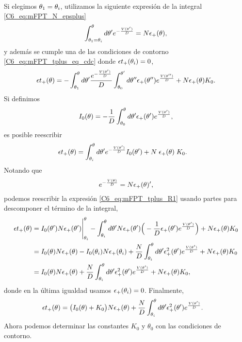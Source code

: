 \documentclass[./main.tex]{subfiles}
\begin{document}
Si elegimos $\theta_1 = \theta_i$, utilizamos la siguiente expresión de la integral \ref{C6_eq:mFPT_N_epsplus}
\begin{align*}
    \int_{\theta_1 = \theta_i}^{\theta} d\theta'  e^{- \frac{V(\theta')}{D}} = N \epsilon_{+}(\theta),
\end{align*}
y además se cumple una de las condiciones de contorno \ref{C6_eq:mFPT_tplus_eq_cdc} donde $\epsilon t_+(\theta_i) = 0$,
\begin{align}
   \epsilon t_+(\theta) = - \int_{\theta_1}^{\theta} d\theta'  \frac{ e^{- \frac{V(\theta')}{D}} }{D} \int_{\theta_0}^{\theta'} d \theta'' \epsilon_{+}(\theta'') e^{ \frac{V(\theta'')}{D}} + N \epsilon_{+}(\theta) K_0 .
\end{align}
Si definimos 
\begin{align*}
I_0(\theta) =  -\frac{1}{D} \int_{\theta_0}^\theta d \theta' \epsilon_{+}(\theta') e^{ \frac{V(\theta')}{D}}, 
\end{align*}
es posible reescribir
\begin{align}
   \epsilon t_+(\theta) &= \int_{\theta_i}^{\theta} d\theta'  e^{- \frac{V(\theta')}{D}}  I_0(\theta')+  N \; \epsilon_{+}(\theta) \; K_0 .
   \label{C6_eq:mFPT_tplus_R1}
\end{align}
Notando que
\begin{align*}
    e^{- \frac{V(\theta)}{D}} = N \epsilon_{+}(\theta)',
\end{align*}
podemos reescribir la expresión \ref{C6_eq:mFPT_tplus_R1} usando partes para descomponer el término de la integral,
\begin{align}
   \epsilon t_+(\theta) &= I_0(\theta') N \epsilon_{+}(\theta') \Bigg|_{\theta_i}^{\theta} - \int_{\theta_i}^{\theta} d\theta' N \epsilon_{+}(\theta') \Big(-\frac{1}{D} \epsilon_{+}(\theta') e^{ \frac{V(\theta')}{D}} \Big) +  N \epsilon_{+}(\theta) K_0 \nonumber \\
            &= I_0(\theta) N \epsilon_{+}(\theta) - I_0(\theta_i) N \epsilon_{+}(\theta_i) + \frac{N}{D} \int_{\theta_i}^{\theta} d\theta'  \epsilon_{+}^2(\theta') e^{ \frac{V(\theta')}{D}} +  N \epsilon_{+}(\theta) K_0 \nonumber \\
            &= I_0(\theta) N \epsilon_{+}(\theta) + \frac{N}{D} \int_{\theta_i}^{\theta} d\theta'  \epsilon_{+}^2(\theta') e^{ \frac{V(\theta')}{D}} +  N \epsilon_{+}(\theta) K_0 ,
\end{align}
donde en la última igualdad usamos $\epsilon_{+}(\theta_i) = 0$. Finalmente, 
\begin{align}
   \epsilon t_+(\theta) &= \big(I_0(\theta)+K_0\big) N \epsilon_{+}(\theta) + \frac{N}{D} \int_{\theta_i}^{\theta} d\theta'  \epsilon_{+}^2(\theta') e^{ \frac{V(\theta')}{D}}.  \label{C6_eq:mFPT_aux}
\end{align}
Ahora podemos determinar las constantes $K_0$ y $\theta_0$ con las condiciones de contorno.
\end{document}
